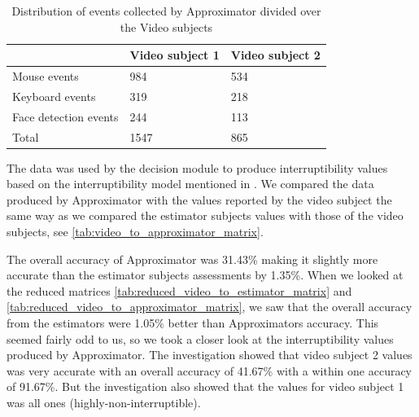\documentclass{sigchi}
\begin{document}
\begin{table}[h]
  \begin{tabular}{@{}lll@{}}
    \toprule
     & Video subject 1 & Video subject 2\\ \midrule
    Mouse events       & 984    & 534    \\
    Keyboard events       & 319    & 218    \\
    Face detection events       & 244    & 113    \\ \midrule
    Total   & 1547 & 865\\ \bottomrule
  \end{tabular}
  \caption{Distribution of events collected by Approximator divided over the Video subjects}
  \label{tab:event_distribution}
\end{table}

The data was used by the decision module to produce interruptibility values based on the interruptibility model mentioned in .
We compared the data produced by Approximator with the values reported by the video subject the same way as we compared the estimator subjects values with those of the video subjects, see \autoref{tab:video_to_approximator_matrix}.

The overall accuracy of Approximator was 31.43\% making it slightly more accurate than the estimator subjects assessments by 1.35\%.
When we looked at the reduced matrices \autoref{tab:reduced_video_to_estimator_matrix} and \autoref{tab:reduced_video_to_approximator_matrix}, we saw that the overall accuracy from the estimators were 1.05\% better than Approximators accuracy.
This seemed fairly odd to us, so we took a closer look at the interruptibility values produced by Approximator.
The investigation showed that video subject 2 values was very accurate with an overall accuracy of 41.67\% with a within one accuracy of 91.67\%.
But the investigation also showed that the values for video subject 1 was all ones (highly-non-interruptible).
\end{document}
